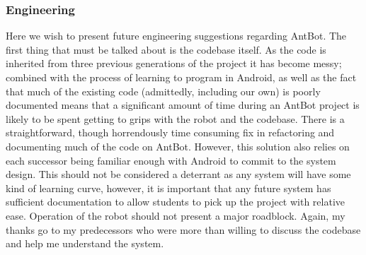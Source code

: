 \documentclass[a4paper,12pt,twoside,openright]{article}
\begin{document}
\subsubsection{Engineering} \label{sec:engineering}
Here we wish to present future engineering suggestions regarding AntBot. The first thing that must be talked
about is the codebase itself. As the code is inherited from three previous generations of the project it has
become messy; combined with the process of learning to program in Android, as well as the fact that
much of the existing code (admittedly, including our own) is poorly documented means that a significant
amount of time during an AntBot project is likely to be spent getting to grips with the robot and the codebase. There
is a straightforward, though horrendously time consuming fix in refactoring and documenting much of the code on
AntBot. However, this solution also relies on each successor being familiar enough with Android to commit to 
the system design. This should not be considered a deterrant as any system will have some kind of learning curve,
however, it is important that any future system has sufficient documentation to allow students to pick up
the project with relative ease. Operation of the robot should not present a major roadblock. Again, my thanks
go to my predecessors who were more than willing to discuss the codebase and help me understand the system.
\newline
\end{document}
